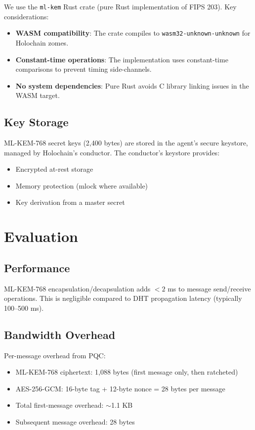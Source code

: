 \documentclass[11pt,twocolumn]{article}
\begin{document}
We use the \texttt{ml-kem} Rust crate (pure Rust implementation of
FIPS 203). Key considerations:

\begin{itemize}[nosep]
  \item \textbf{WASM compatibility}: The crate compiles to
    \texttt{wasm32-unknown-unknown} for Holochain zomes.
  \item \textbf{Constant-time operations}: The implementation uses
    constant-time comparisons to prevent timing side-channels.
  \item \textbf{No system dependencies}: Pure Rust avoids C library
    linking issues in the WASM target.
\end{itemize}

\subsection{Key Storage}

ML-KEM-768 secret keys (2,400 bytes) are stored in the agent's secure
keystore, managed by Holochain's conductor. The conductor's keystore
provides:

\begin{itemize}[nosep]
  \item Encrypted at-rest storage
  \item Memory protection (mlock where available)
  \item Key derivation from a master secret
\end{itemize}

\section{Evaluation}

\subsection{Performance}

ML-KEM-768 encapsulation/decapsulation adds $<2$ ms to message send/receive
operations. This is negligible compared to DHT propagation latency (typically
100--500 ms).

\subsection{Bandwidth Overhead}

Per-message overhead from PQC:
\begin{itemize}[nosep]
  \item ML-KEM-768 ciphertext: 1,088 bytes (first message only, then ratcheted)
  \item AES-256-GCM: 16-byte tag + 12-byte nonce = 28 bytes per message
  \item Total first-message overhead: $\sim$1.1 KB
  \item Subsequent message overhead: 28 bytes
\end{itemize}
\end{document}
